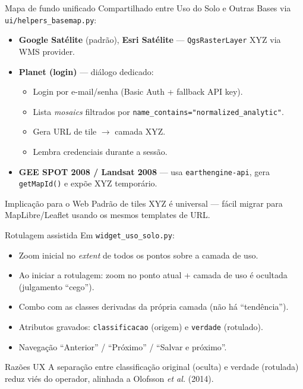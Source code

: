 \documentclass[10pt,aspectratio=169]{beamer}
\begin{document}
\begin{frame}{Mapa de fundo unificado}
  Compartilhado entre Uso do Solo e Outras Bases via \texttt{ui/helpers\_basemap.py}:
  \begin{itemize}
    \item \textbf{Google Satélite} (padrão), \textbf{Esri Satélite} — \texttt{QgsRasterLayer} XYZ via WMS provider.
    \item \textbf{Planet (login)} — diálogo dedicado:
      \begin{itemize}
        \item Login por e-mail/senha (Basic Auth + fallback API key).
        \item Lista \emph{mosaics} filtrados por \texttt{name\_contains="normalized\_analytic"}.
        \item Gera URL de tile $\rightarrow$ camada XYZ.
        \item Lembra credenciais durante a sessão.
      \end{itemize}
    \item \textbf{GEE SPOT 2008 / Landsat 2008} — usa \texttt{earthengine-api}, gera \texttt{getMapId()} e expõe XYZ temporário.
  \end{itemize}
  \begin{exampleblock}{Implicação para o Web}
    Padrão de tiles XYZ é universal — fácil migrar para MapLibre/Leaflet usando os mesmos templates de URL.
  \end{exampleblock}
\end{frame}

\begin{frame}{Rotulagem assistida}
  Em \texttt{widget\_uso\_solo.py}:
  \begin{itemize}
    \item Zoom inicial no \emph{extent} de todos os pontos sobre a camada de uso.
    \item Ao iniciar a rotulagem: zoom no ponto atual + camada de uso é ocultada (julgamento ``cego'').
    \item Combo com as classes derivadas da própria camada (não há ``tendência'').
    \item Atributos gravados: \texttt{classificacao} (origem) e \texttt{verdade} (rotulado).
    \item Navegação ``Anterior'' / ``Próximo'' / ``Salvar e próximo''.
  \end{itemize}
  \begin{block}{Razões UX}
    A separação entre classificação original (oculta) e verdade (rotulada) reduz viés do operador, alinhada a Olofsson \emph{et al.} (2014).
  \end{block}
\end{frame}
\end{document}
